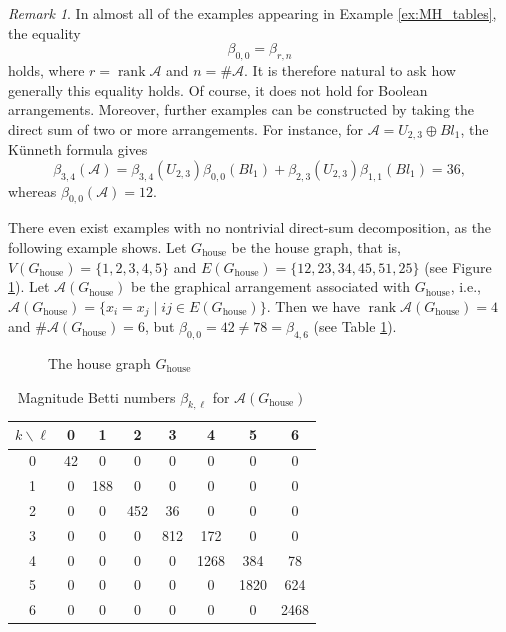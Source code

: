 \documentclass{amsart}
\numberwithin{equation}{section}
\theoremstyle{plain}
\theoremstyle{remark}
\newtheorem{rem}[thm]{Remark}
\theoremstyle{definition}
\numberwithin{equation}{section}
\newcommand{\A}{\mathcal{A}}
\newcommand{\house}{\mathrm{house}}
\DeclareMathOperator{\rank}{rank}
\begin{document}
\FloatBarrier

\begin{rem}
In almost all of the examples appearing in Example \ref{ex:MH_tables}, the equality
\[
\beta_{0,0}=\beta_{r,n}
\]
holds, where $r=\rank \A$ and $n=\#\A$. It is therefore natural to ask how generally this equality holds. Of course, it does not hold for Boolean arrangements. Moreover, further examples can be constructed by taking the direct sum of two or more arrangements. For instance, for $\A=U_{2,3}\oplus Bl_1$, the K\"unneth formula gives
\[
\beta_{3,4}(\A)
=
\beta_{3,4}(U_{2,3})\beta_{0,0}(Bl_1)
+
\beta_{2,3}(U_{2,3})\beta_{1,1}(Bl_1)
=36,
\]
whereas $\beta_{0,0}(\A)=12$.

There even exist examples with no nontrivial direct-sum decomposition, as the following example shows.
Let $G_{\house}$ be the house graph, that is, $V(G_\house)=\{1,2,3,4,5\}$ and $E(G_\house)=\{12,23,34,45,51,25\}$ (see Figure \ref{fig:Ghouse}).
Let $\A(G_\house)$ be the graphical arrangement associated with $G_\house$, i.e., $\A(G_\house)=\{x_i=x_j\mid ij\in E(G_\house)\}$.
Then we have $\rank \A(G_\house)=4$ and $\#\A(G_\house)=6$, but $\beta_{0,0}=42\neq 78=\beta_{4,6}$ (see Table \ref{tab:large_beta_r_n}).
\end{rem}

\begin{figure}[htpb]
\centering
{}
\vspace{1ex}
\caption{The house graph $G_\house$}
\label{fig:Ghouse}
\end{figure}

\begin{table}[htpb]
\centering
\begin{tabular}{c|ccccccc}
\hline
$k \backslash \ell$ & 0 & 1 & 2 & 3 & 4 & 5 & 6\\
\hline
0 & 42 & 0  & 0  & 0   & 0   & 0   & 0\\
1 & 0  & 188& 0  & 0   & 0   & 0   & 0\\
2 & 0  & 0  & 452& 36  & 0   & 0   & 0\\
3 & 0  & 0  & 0  & 812 & 172 & 0   & 0\\
4 & 0  & 0  & 0  & 0   & 1268& 384 & 78\\
5 & 0  & 0  & 0  & 0   & 0   & 1820& 624\\
6 & 0  & 0  & 0  & 0   & 0   & 0   & 2468\\
\hline
\end{tabular}
\vspace{1ex}
\caption{Magnitude Betti numbers $\beta_{k,\ell}$ for $\A(G_\house)$}
\label{tab:large_beta_r_n}
\end{table}

\FloatBarrier


\renewcommand\refname{References}


\end{document}
